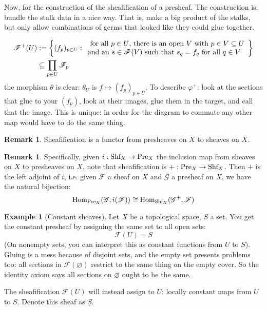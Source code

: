 \documentclass[10pt,reqno]{amsart}
\theoremstyle{definition}
\newtheorem{example}[theorem]{Example}
\newtheorem{remark}[theorem]{Remark}
\theoremstyle{remark}
\numberwithin{equation}{section}
\numberwithin{theorem}{section}
\newcommand{\Hom}{\textup{Hom}}
\newcommand{\FF}{{\mathscr F}}
\newcommand{\GG}{{\mathscr G}}
\begin{document}
Now, for the construction of the sheafification of a presheaf. The construction is: bundle the stalk data in a nice way. That is, make a big product of the stalks, but only allow combinations of germs that looked like they could glue together.

\begin{align*}
\FF^+(U) &:= \left\{(f_p)_{p \in U} : \begin{array}{l} \textup{ for all $p \in U$, there is an open $V$ with $p \in V \subseteq U$} \\ \textup{and an $s \in \FF(V)$ such that $s_q = f_q$ for all $q \in V$}\end{array}\right\}\\
& \subseteq \prod_{p \in U}\FF_p
\end{align*}
the morphism $\theta$ is clear: $\theta_U$ is $f \mapsto (f_p)_{p \in U}$. To describe $\varphi^{+}$: look at the sections that glue to your $(f_p)$, look at their images, glue them in the target, and call that the image. This is unique: in order for the diagram to commute any other map would have to do the same thing.

\begin{remark} Sheafification is a functor from presheaves on $X$ to sheaves on $X$.
\end{remark}

\begin{remark} Specifically, given $i: \textup{Shf}_X \to \textup{Pre}_X$ the inclusion map from sheaves on $X$ to presheaves on $X$, note that sheafification is  $+: \textup{Pre}_X \to \textup{Shf}_X$. Then $+$ is the left adjoint of $i$, i.e. given $\FF$ a sheaf on $X$ and $\GG$ a presheaf on $X$, we have the natural bijection:
\[\Hom_{\textup{Pre}_X} (\GG, i(\FF)) \cong \Hom_{\textup{Shf}_X}(\GG^+, \FF)\] 
\end{remark}

\begin{example}[Constant sheaves] Let $X$ be a topological space, $S$ a set. You get the constant presheaf by assigning the same set to all open sets:
\[\FF(U) = S\]
(On nonempty sets, you can interpret this as constant functions from $U$ to $S$). Gluing is a mess because of disjoint sets, and the empty set presents problems too: all sections in $\FF(\varnothing)$ restrict to the same thing on the empty cover. So the identity axiom says all sections on $\varnothing$ ought to be the same.

The sheafification $\FF(U)$ will instead assign to $U$: locally constant maps from $U$ to $S$. Denote this sheaf as $\underline{S}$.
\end{example}
\end{document}
